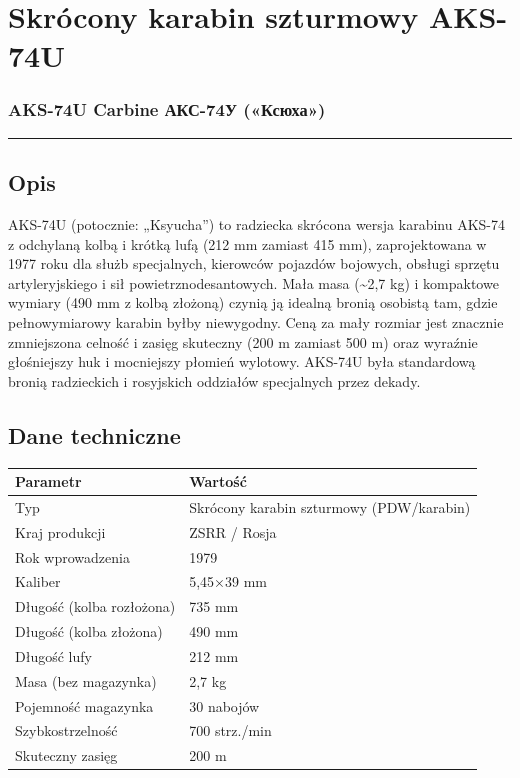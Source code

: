 \documentclass[12pt,openany,oneside]{book}
\begin{document}
\chapter{Skrócony karabin szturmowy
AKS-74U}\label{skruxf3cony-karabin-szturmowy-aks-74u}

\subsection{AKS-74U Carbine \textbar{} АКС-74У
(«Ксюха»)}\label{aks-74u-carbine-ux430ux43aux441-74ux443-ux43aux441ux44eux445ux430}

\begin{center}\rule{0.5\linewidth}{0.5pt}\end{center}

\section{Opis}\label{opis-45}

AKS-74U (potocznie: „Ksyucha'') to radziecka skrócona wersja karabinu
AKS-74 z odchylaną kolbą i krótką lufą (212 mm zamiast 415 mm),
zaprojektowana w 1977 roku dla służb specjalnych, kierowców pojazdów
bojowych, obsługi sprzętu artyleryjskiego i sił powietrznodesantowych.
Mała masa (\textasciitilde2,7 kg) i kompaktowe wymiary (490 mm z kolbą
złożoną) czynią ją idealną bronią osobistą tam, gdzie pełnowymiarowy
karabin byłby niewygodny. Ceną za mały rozmiar jest znacznie zmniejszona
celność i zasięg skuteczny (200 m zamiast 500 m) oraz wyraźnie
głośniejszy huk i mocniejszy płomień wylotowy. AKS-74U była standardową
bronią radzieckich i rosyjskich oddziałów specjalnych przez dekady.

\section{Dane techniczne}\label{dane-techniczne-45}

\begin{longtable}[]{@{}ll@{}}
\toprule\noalign{}
Parametr & Wartość \\
\midrule\noalign{}
\endhead
\bottomrule\noalign{}
\endlastfoot
Typ & Skrócony karabin szturmowy (PDW/karabin) \\
Kraj produkcji & ZSRR / Rosja \\
Rok wprowadzenia & 1979 \\
Kaliber & 5,45×39 mm \\
Długość (kolba rozłożona) & 735 mm \\
Długość (kolba złożona) & 490 mm \\
Długość lufy & 212 mm \\
Masa (bez magazynka) & 2,7 kg \\
Pojemność magazynka & 30 nabojów \\
Szybkostrzelność & 700 strz./min \\
Skuteczny zasięg & 200 m \\
\end{longtable}
\end{document}
